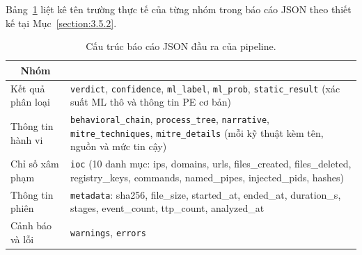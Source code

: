 \documentclass[../DoAn.tex]{subfiles}
\begin{document}
Bảng~\ref{tab:report-impl} liệt kê tên trường thực tế của từng
nhóm trong báo cáo JSON theo thiết kế tại Mục~\ref{section:3.5.2}.
\begin{table}[H]
\centering
\caption{Cấu trúc báo cáo JSON đầu ra của pipeline.}
\label{tab:report-impl}
\begin{tabular}{|l|>{\raggedright\arraybackslash}p{9cm}|}
\hline
\multicolumn{1}{|c|}{\textbf{Nhóm}} & \multicolumn{1}{c|}{\textbf{Trường JSON}} \\
\hline
Kết quả phân loại   &
  \texttt{verdict}, \texttt{confidence},
  \texttt{ml\_label}, \texttt{ml\_prob},
  \texttt{static\_result} (xác suất ML thô và thông tin PE cơ bản) \\
\hline
Thông tin hành vi   &
  \texttt{behavioral\_chain}, \texttt{process\_tree},
  \texttt{narrative}, \texttt{mitre\_techniques},
  \texttt{mitre\_details} (mỗi kỹ thuật kèm tên, nguồn và mức tin cậy) \\
\hline
Chỉ số xâm phạm    &
  \texttt{ioc} (10 danh mục: ips, domains, urls,
  files\_created, files\_deleted, registry\_keys,
  commands, named\_pipes, injected\_pids, hashes) \\
\hline
Thông tin phiên     &
  \texttt{metadata}: sha256, file\_size, started\_at,
  ended\_at, duration\_s, stages, event\_count,
  ttp\_count, analyzed\_at \\
\hline
Cảnh báo và lỗi    &
  \texttt{warnings}, \texttt{errors} \\
\hline
\end{tabular}
\end{table}
\end{document}
